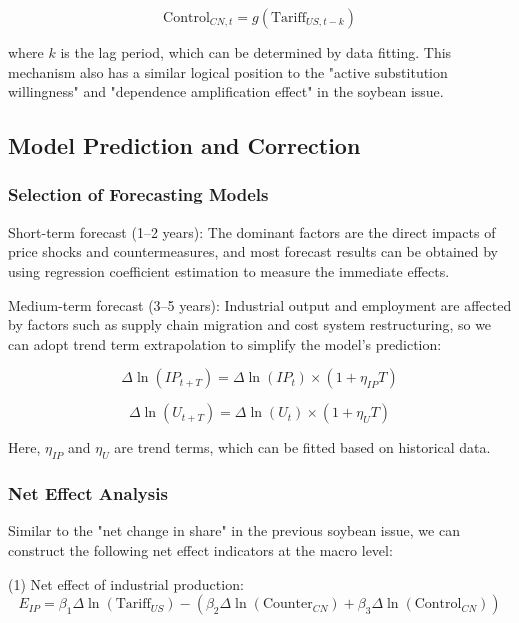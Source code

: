 \documentclass{apmcmthesis}
\begin{document}
\begin{equation}
\text{Control}_{CN,t} = g(\text{Tariff}_{US,t-k})
\end{equation}

where $k$ is the lag period, which can be determined by data fitting. This mechanism also has a similar logical position to the "active substitution willingness" and "dependence amplification effect" in the soybean issue.

\subsection{Model Prediction and Correction}

\subsubsection{Selection of Forecasting Models}

Short-term forecast (1--2 years): The dominant factors are the direct impacts of price shocks and countermeasures, and most forecast results can be obtained by using regression coefficient estimation to measure the immediate effects.

Medium-term forecast (3--5 years): Industrial output and employment are affected by factors such as supply chain migration and cost system restructuring, so we can adopt trend term extrapolation to simplify the model's prediction:

\begin{equation}
\Delta \ln(IP_{t+T}) = \Delta \ln(IP_t) \times (1 + \eta_{IP} T)
\end{equation}

\begin{equation}
\Delta \ln(U_{t+T}) = \Delta \ln(U_t) \times (1 + \eta_{U} T)
\end{equation}

Here, $\eta_{IP}$ and $\eta_{U}$ are trend terms, which can be fitted based on historical data.

\subsubsection{Net Effect Analysis}

Similar to the "net change in share" in the previous soybean issue, we can construct the following net effect indicators at the macro level:

(1) Net effect of industrial production:
\begin{equation}
E_{IP} = 
\beta_1 \Delta\ln(\text{Tariff}_{US})
-
\left(
\beta_2 \Delta\ln(\text{Counter}_{CN})
+
\beta_3 \Delta\ln(\text{Control}_{CN})
\right)
\end{equation}
\end{document}
